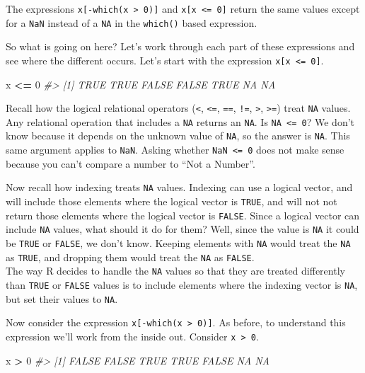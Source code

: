 \documentclass[]{book}
\newenvironment{Shaded}{\begin{snugshade}}{\end{snugshade}}
\newcommand{\CommentTok}[1]{\textcolor[rgb]{0.56,0.35,0.01}{\textit{#1}}}
\newcommand{\DecValTok}[1]{\textcolor[rgb]{0.00,0.00,0.81}{#1}}
\newcommand{\NormalTok}[1]{#1}
\newcommand{\OperatorTok}[1]{\textcolor[rgb]{0.81,0.36,0.00}{\textbf{#1}}}
\newcommand{\StringTok}[1]{\textcolor[rgb]{0.31,0.60,0.02}{#1}}
\theoremstyle{plain}
\theoremstyle{remark}
\begin{document}
The expressions \texttt{x{[}-which(x\ \textgreater{}\ 0){]}} and \texttt{x{[}x\ \textless{}=\ 0{]}} return the same values except
for a \texttt{NaN} instead of a \texttt{NA} in the \texttt{which()} based expression.

So what is going on here? Let's work through each part of these expressions and
see where the different occurs.
Let's start with the expression \texttt{x{[}x\ \textless{}=\ 0{]}}.

\begin{Shaded}
\begin{Highlighting}[]
\NormalTok{x }\OperatorTok{<=}\StringTok{ }\DecValTok{0}
\CommentTok{#> [1]  TRUE  TRUE FALSE FALSE  TRUE    NA    NA}
\end{Highlighting}
\end{Shaded}

Recall how the logical relational operators (\texttt{\textless{}}, \texttt{\textless{}=}, \texttt{==}, \texttt{!=}, \texttt{\textgreater{}}, \texttt{\textgreater{}=}) treat \texttt{NA} values.
Any relational operation that includes a \texttt{NA} returns an \texttt{NA}.
Is \texttt{NA\ \textless{}=\ 0}? We don't know because it depends on the unknown value of \texttt{NA}, so the answer is \texttt{NA}.
This same argument applies to \texttt{NaN}. Asking whether \texttt{NaN\ \textless{}=\ 0} does not make sense because you can't compare a number to ``Not a Number''.

Now recall how indexing treats \texttt{NA} values.
Indexing can use a logical vector, and will include those elements where the logical vector is \texttt{TRUE},
and will not not return those elements where the logical vector is \texttt{FALSE}.
Since a logical vector can include \texttt{NA} values, what should it do for them?
Well, since the value is \texttt{NA} it could be \texttt{TRUE} or \texttt{FALSE}, we don't know.
Keeping elements with \texttt{NA} would treat the \texttt{NA} as \texttt{TRUE}, and dropping them would treat the \texttt{NA} as \texttt{FALSE}.\\
The way R decides to handle the \texttt{NA} values so that they are treated differently than \texttt{TRUE} or \texttt{FALSE} values is to include elements where the indexing vector is \texttt{NA}, but set their values to \texttt{NA}.

Now consider the expression \texttt{x{[}-which(x\ \textgreater{}\ 0){]}}.
As before, to understand this expression we'll work from the inside out.
Consider \texttt{x\ \textgreater{}\ 0}.

\begin{Shaded}
\begin{Highlighting}[]
\NormalTok{x }\OperatorTok{>}\StringTok{ }\DecValTok{0}
\CommentTok{#> [1] FALSE FALSE  TRUE  TRUE FALSE    NA    NA}
\end{Highlighting}
\end{Shaded}
\end{document}
